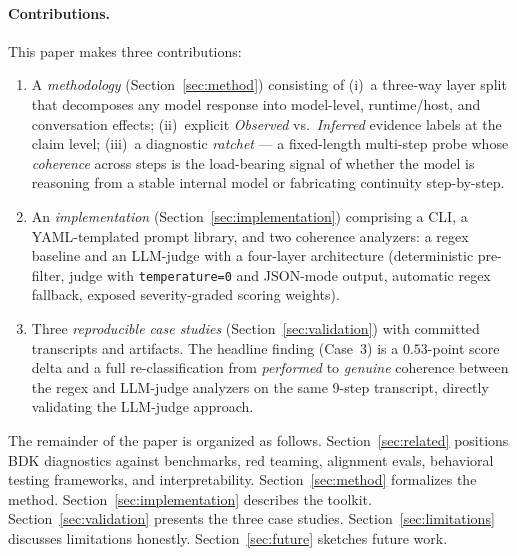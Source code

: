 \paragraph{Contributions.}
This paper makes three contributions:
\begin{enumerate}
    \item A \emph{methodology} (Section~\ref{sec:method}) consisting of
          (i)~a three-way layer split that decomposes any model response
          into model-level, runtime/host, and conversation effects;
          (ii)~explicit \emph{Observed} vs.\ \emph{Inferred} evidence
          labels at the claim level; (iii)~a diagnostic \emph{ratchet}
          --- a fixed-length multi-step probe whose \emph{coherence}
          across steps is the load-bearing signal of whether the model
          is reasoning from a stable internal model or fabricating
          continuity step-by-step.
    \item An \emph{implementation} (Section~\ref{sec:implementation})
          comprising a CLI, a YAML-templated prompt library, and two
          coherence analyzers: a regex baseline and an LLM-judge with a
          four-layer architecture (deterministic pre-filter, judge with
          \texttt{temperature=0} and JSON-mode output, automatic
          regex fallback, exposed severity-graded scoring weights).
    \item Three \emph{reproducible case studies}
          (Section~\ref{sec:validation}) with committed transcripts and
          artifacts. The headline finding (Case~3) is a $0.53$-point
          score delta and a full re-classification from
          \emph{performed} to \emph{genuine} coherence between the
          regex and LLM-judge analyzers on the same 9-step transcript,
          directly validating the LLM-judge approach.
\end{enumerate}

The remainder of the paper is organized as follows. Section~\ref{sec:related}
positions BDK diagnostics against benchmarks, red teaming, alignment evals,
behavioral testing frameworks, and interpretability.
Section~\ref{sec:method} formalizes the method.
Section~\ref{sec:implementation} describes the toolkit.
Section~\ref{sec:validation} presents the three case studies.
Section~\ref{sec:limitations} discusses limitations honestly.
Section~\ref{sec:future} sketches future work.

